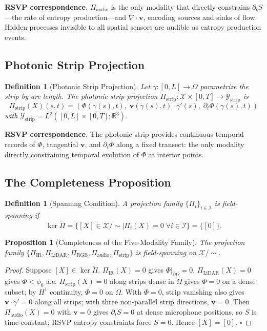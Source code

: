 \documentclass[11pt, oneside]{article}
\newtheorem{proposition}[theorem]{Proposition}
\newtheorem{definition}[theorem]{Definition}
\newcommand{\Xmod}{\mathcal{X}/{\sim}}
\newcommand{\Ftil}{\widetilde{\Pi}}
\begin{document}
\textbf{RSVP correspondence.} $\Pi_{\mathrm{audio}}$ is the only modality that directly
constrains $\partial_t S$---the rate of entropy production---and $\nabla \cdot \mathbf{v}$,
encoding sources and sinks of flow. Hidden processes invisible to all spatial sensors are
audible as entropy production events.

\subsection{Photonic Strip Projection}

\begin{definition}[Photonic Strip Projection]
Let $\gamma : [0,L] \to \Omega$ parametrize the strip by arc length. The photonic strip
projection $\Pi_{\mathrm{strip}} : \mathcal{X} \times [0,T] \to \mathcal{Y}_{\mathrm{strip}}$
is
\[
\Pi_{\mathrm{strip}}(X)(s,t) =
\left( \Phi(\gamma(s),t),\;
\mathbf{v}(\gamma(s),t) \cdot \gamma'(s),\;
\partial_t \Phi(\gamma(s),t) \right)
\]
with $\mathcal{Y}_{\mathrm{strip}} = L^2([0,L] \times [0,T];\mathbb{R}^3)$.
\end{definition}

\textbf{RSVP correspondence.} The photonic strip provides continuous temporal records of
$\Phi$, tangential $\mathbf{v}$, and $\partial_t \Phi$ along a fixed transect: the only
modality directly constraining temporal evolution of $\Phi$ at interior points.

\subsection{The Completeness Proposition}

\begin{definition}[Spanning Condition]
A projection family $\{\Pi_i\}_{i \in \mathcal{I}}$ is \emph{field-spanning} if
\[
\ker \Ftil = \{ [X] \in \Xmod \mid \Pi_i(X) = 0 \;\forall i \in \mathcal{I} \} = \{[0]\}.
\]
\end{definition}

\begin{proposition}[Completeness of the Five-Modality Family]
\label{prop:completeness}
The projection family $\{\Pi_{\mathrm{IR}}, \Pi_{\mathrm{LiDAR}}, \Pi_{\mathrm{RGB}},
\Pi_{\mathrm{audio}}, \Pi_{\mathrm{strip}}\}$ is field-spanning on $\Xmod$.
\end{proposition}

\begin{proof}
Suppose $[X] \in \ker \Ftil$. $\Pi_{\mathrm{IR}}(X) = 0$ gives
$\Phi|_{\partial\Omega} = 0$. $\Pi_{\mathrm{LiDAR}}(X) = 0$ gives $\Phi < \phi_0$
a.e. $\Pi_{\mathrm{strip}}(X) = 0$ along strips dense in $\Omega$ gives $\Phi = 0$
on a dense subset; by $H^1$ continuity, $\Phi = 0$ on $\Omega$. With $\Phi = 0$,
strip vanishing also gives $\mathbf{v} \cdot \gamma' = 0$ along all strips; with three
non-parallel strip directions, $\mathbf{v} = 0$. Then $\Pi_{\mathrm{audio}}(X) = 0$
with $\mathbf{v} = 0$ gives $\partial_t S = 0$ at dense microphone positions, so $S$
is time-constant; RSVP entropy constraints force $S = 0$. Hence $[X] = [0]$. $\square$
\end{proof}
\end{document}
